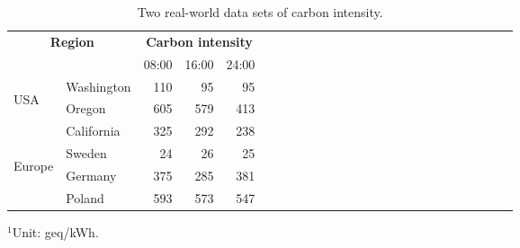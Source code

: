 \documentclass[conference, 10pt, ﬁnal, letterpaper, twocolumn]{IEEEtran}
\begin{document}
\begin{table}[h]
    \caption{\label{tab:data}Two real-world data sets of carbon intensity.}
    \footnotesize
    \begin{center}
        \begin{threeparttable}[b]
            \begin{tabular}{*{5}{llrrr}}
                \toprule
                \midrule
                 \multicolumn{2}{c}{\multirow{2}{*}{\bf Region}} & \multicolumn{3}{c}{\bf Carbon intensity\tnote{1}}\\
                 \cmidrule(lr){3-5}
                \multicolumn{2}{c}{} & 08:00 & 16:00 & 24:00 \\
                \midrule
                 \multirow{3}{*}{\begin{turn}{90} USA \end{turn}} & Washington & 110 & 95  & 95\\
                 & Oregon & 605 & 579 & 413\\
                 & California & 325 & 292  & 238\\
                \midrule
                 \multirow{3}{*}{\begin{turn}{90} Europe \end{turn}} & Sweden & 24 & 26 & 25\\
                 & Germany & 375 & 285 & 381\\
                 & Poland & 593 & 573 & 547\\
                \midrule
                \bottomrule
            \end{tabular}
            
            \begin{tablenotes}
            	\footnotesize
            	\item $^1$Unit: geq/kWh.
            \end{tablenotes}
        \end{threeparttable}
    \end{center}
\end{table}
\end{document}
